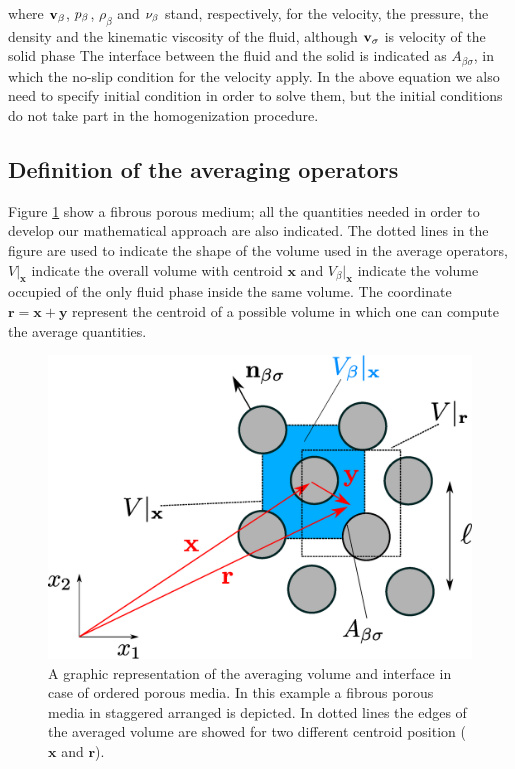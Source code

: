 where $\textbf{v}_{\beta}$, $p_{\beta}$, $\rho_{\beta}$ and $\nu_{\beta}$ stand, respectively, for  the velocity, the pressure, the density and the kinematic viscosity of the fluid, although  $\textbf{v}_{\sigma}$ is velocity of the solid phase
The interface between the fluid and the solid is indicated as $A_{\beta\sigma}$, in which the no-slip condition for the velocity apply.
In the above equation we also need to specify initial condition in order to solve them, but the initial conditions do not take part in the homogenization procedure.

\subsection{Definition of the averaging operators}



Figure \ref{fig:rev} show a fibrous porous medium; all the quantities needed in order to develop our mathematical approach are also indicated.
The dotted lines in the figure are used to indicate the shape of the volume used in the average operators, $V|_{\mathbf{x}}$ indicate the overall volume with centroid $\mathbf{x}$ and $V_{\beta}|_{\mathbf{x}}$ indicate the volume occupied of the only fluid phase inside the same volume.
The coordinate $\mathbf{r} = \mathbf{x} +\mathbf{y}$ represent the centroid of a possible volume in which one can compute the average quantities.

\begin{figure}[h]
	\centering
	\includegraphics[width=0.7\linewidth]{chapter_2/figure/REV}
	\caption{A graphic representation of the averaging volume and interface in case of ordered porous media. In this example a fibrous  porous media in staggered arranged is depicted. In dotted lines the edges of the averaged volume are showed for two different centroid position ($\mathbf{x}$ and $\mathbf{r}$).}
	\label{fig:rev}
\end{figure}

